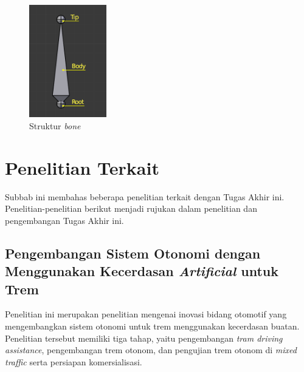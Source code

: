 \begin{figure}[ht]
    \centering
    \includegraphics[width=0.3\textwidth]{resources/chapter-2-bone-structure.png}
    \caption{Struktur \textit{bone} \parencite{blender-manual}}
    \label{fig:bone-structure}
\end{figure}



\section{Penelitian Terkait}

Subbab ini membahas beberapa penelitian terkait dengan Tugas Akhir ini.
Penelitian-penelitian berikut menjadi rujukan dalam penelitian dan pengembangan
Tugas Akhir ini.

\subsection{Pengembangan Sistem Otonomi dengan Menggunakan Kecerdasan \textit{Artificial} untuk Trem \parencite{rispro-trilaksono}}
\label{subsec:rispro-trilaksono}

Penelitian ini merupakan penelitian mengenai inovasi bidang otomotif yang
mengembangkan sistem otonomi untuk trem menggunakan kecerdasan buatan.
Penelitian tersebut memiliki tiga tahap, yaitu pengembangan \textit{tram driving
assistance}, pengembangan trem otonom, dan pengujian trem otonom di
\textit{mixed traffic} serta persiapan komersialisasi.

